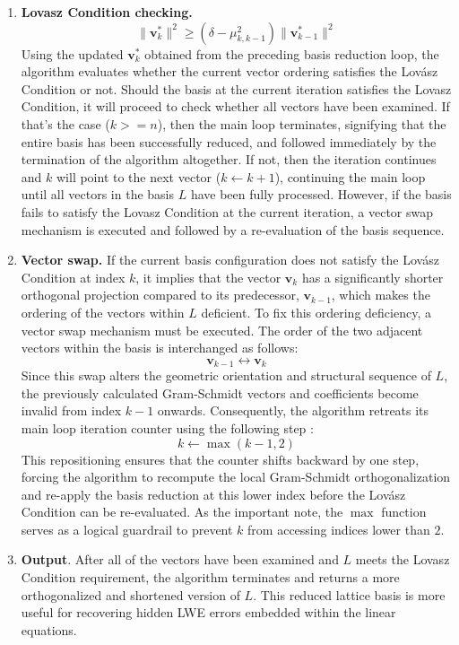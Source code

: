 \begin{enumerate}
    \item \textbf{Lovasz Condition checking.} $$\|\mathbf{v}_k^*\|^2 \ge \left(\delta - \mu_{k,k-1}^2\right)\|\mathbf{v}_{k-1}^*\|^2$$ Using the updated $\mathbf{v}_k^*$ obtained from the preceding basis reduction loop, the algorithm evaluates whether the current vector ordering satisfies the Lovász Condition or not. Should the basis at the current iteration satisfies the Lovasz Condition, it will proceed to check whether all vectors have been examined. If that's the case ($k >= n$), then the main loop terminates, signifying that the entire basis has been successfully reduced, and followed immediately by the termination of the algorithm altogether. If not, then the iteration continues and $k$ will point to the next vector ($k \leftarrow k + 1$), continuing the main loop until all vectors in the basis $L$ have been fully processed. However, if the basis fails to satisfy the Lovasz Condition at the current iteration, a vector swap mechanism is executed and followed by a re-evaluation of the basis sequence.
    \item \textbf{Vector swap.} If the current basis configuration does not satisfy the Lovász Condition at index $k$, it implies that the vector $\mathbf{v}_k$ has a significantly shorter orthogonal projection compared to its predecessor, $\mathbf{v}_{k-1}$, which makes the ordering of the vectors within $L$ deficient. To fix this ordering deficiency, a vector swap mechanism must be executed. The order of the two adjacent vectors within the basis is interchanged as follows:
    \begin{equation}
    \mathbf{v}_{k-1} \leftrightarrow \mathbf{v}_k
    \end{equation}
    Since this swap alters the geometric orientation and structural sequence of $L$, the previously calculated Gram-Schmidt vectors and coefficients become invalid from index $k-1$ onwards. Consequently, the algorithm retreats its main loop iteration counter using the following step :
    \begin{equation}
    k \leftarrow \max(k-1, 2)
    \end{equation}
    This repositioning ensures that the counter shifts backward by one step, forcing the algorithm to recompute the local Gram-Schmidt orthogonalization and re-apply the basis reduction at this lower index before the Lovász Condition can be re-evaluated. As the important note, the $\max$ function serves as a logical guardrail to prevent $k$ from accessing indices lower than $2$.
    \item \textbf{Output}. After all of the vectors have been examined and $L$ meets the Lovasz Condition requirement, the algorithm terminates and returns a more orthogonalized and shortened version of $L$. This reduced lattice basis is more useful for recovering hidden LWE errors embedded within the linear equations. 
    
\end{enumerate}

